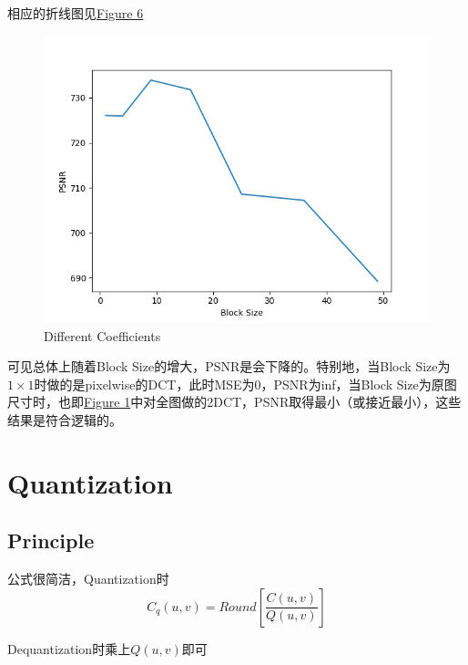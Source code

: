 \documentclass[UTF8]{ctexart}
\begin{document}
	相应的折线图见\hyperref[Fig.part1-3-2]{Figure 6}
	
	\begin{figure}[htbp]
		\centering
		\includegraphics[width=1.0\textwidth]{../part1-3-2.png}
		\caption{Different Coefficients}
		\label{Fig.part1-3-2}
	\end{figure}
	
	可见总体上随着Block Size的增大，PSNR是会下降的。特别地，当Block Size为$1\times 1$时做的是pixelwise的DCT，此时MSE为0，PSNR为inf，当Block Size为原图尺寸时，也即\hyperref[Fig.part1-1-1]{Figure 1}中对全图做的2DCT，PSNR取得最小（或接近最小），这些结果是符合逻辑的。
	
	\section{Quantization}
	
	\subsection{Principle}
	公式很简洁，Quantization时
	\begin{equation*}
	C_q(u,v)=Round[\frac{C(u, v)}{Q(u, v)}]
	\end{equation*}
	
	Dequantization时乘上$Q(u, v)$即可
	
\end{document}

